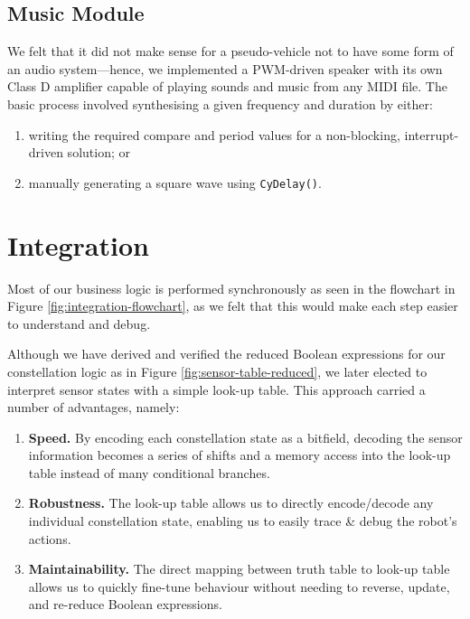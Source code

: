 \documentclass[conference]{IEEEtran}
\begin{document}
\subsection{Music Module}

We felt that it did not make sense for a pseudo-vehicle not to have some form of an audio system—hence, we implemented a PWM-driven speaker with its own Class D amplifier capable of playing sounds and music from any MIDI file.
The basic process involved synthesising a given frequency and duration by either:
\begin{enumerate}
	\item writing the required compare and period values for a non-blocking, interrupt-driven solution; or
	\item manually generating a square wave using \texttt{CyDelay()}.
\end{enumerate}



\section{Integration}

Most of our business logic is performed synchronously as seen in the flowchart in Figure \ref{fig:integration-flowchart}, as we felt that this would make each step easier to understand and debug.

Although we have derived and verified the reduced Boolean expressions for our constellation logic as in Figure \ref{fig:sensor-table-reduced}, we later elected to interpret sensor states with a simple look-up table.
This approach carried a number of advantages, namely:
\begin{enumerate}
	\item \textbf{Speed.} By encoding each constellation state as a bitfield, decoding the sensor information becomes a series of shifts and a memory access into the look-up table instead of many conditional branches.
	\item \textbf{Robustness.} The look-up table allows us to directly encode/decode any individual constellation state, enabling us to easily trace \& debug the robot's actions.
	\item \textbf{Maintainability.} The direct mapping between truth table to look-up table allows us to quickly fine-tune behaviour without needing to reverse, update, and re-reduce Boolean expressions.
\end{enumerate}
\end{document}
